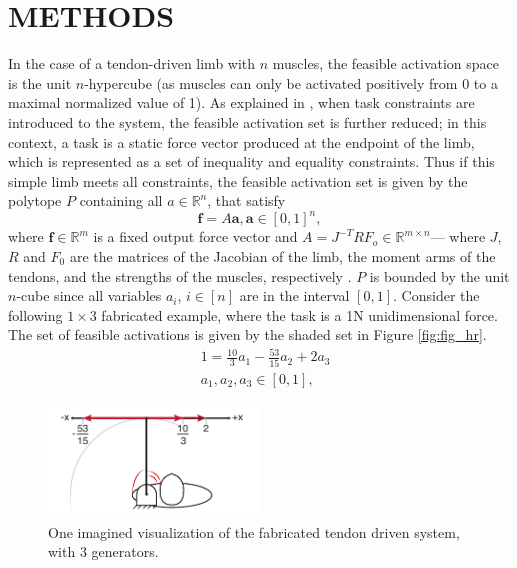 \section{METHODS}
\label{s:methods}
In the case of a tendon-driven limb with $n$ muscles, the feasible activation space is the unit $n$-hypercube (as muscles can only be activated positively from 0 to a maximal normalized value of 1). As explained in \cite{Valero-Cuevas2009mathematical}, when task constraints are introduced to the system, the feasible activation set is further reduced; in this context, a task is a static force vector produced at the endpoint of the limb, which is represented as a set of inequality and equality constraints. Thus if this simple limb meets all constraints, the feasible activation set is given by the polytope $P$ containing all $a \in \mathbb{R}^n$, that satisfy
\[\textbf{f} = A\textbf{a}, \textbf{a} \in [0,1]^n,\]
where $\textbf{f} \in \mathbb{R}^m$ is a fixed output force vector and $A = J^{-T}RF_o \in \mathbb{R}^{m \times n}$--- where $J$, $R$ and $F_0$ are the matrices of the Jacobian of the limb, the moment arms of the tendons, and the strengths of the muscles, respectively \cite{Valero-Cuevas1998Large,Valero-Cuevas2009mathematical}. 
$P$ is bounded by the unit $n$-cube since all variables $a_i$, $i \in [n]$ are in the interval $[0,1]$.
Consider the following $1 \times 3$ fabricated example, where the task is a 1N unidimensional force. The set of feasible activations is given by the shaded set in Figure \ref{fig:fig_hr}.
\begin{align*}
&1 = \frac{10}{3}a_1 - \frac{53}{15}a_2 + 2a_3 \\
&a_1, a_2, a_3 \in [0,1],
\end{align*}

\begin{figure}[schematic_arm]
  \label{fig:schematic_arm}
  \centering
  \includegraphics[width=0.5\textwidth]{figs/schematic_arm_1D.pdf}
  \caption{One imagined visualization of the fabricated tendon driven system, with 3 generators.}
  \label{fig:finger}
\end{figure}


